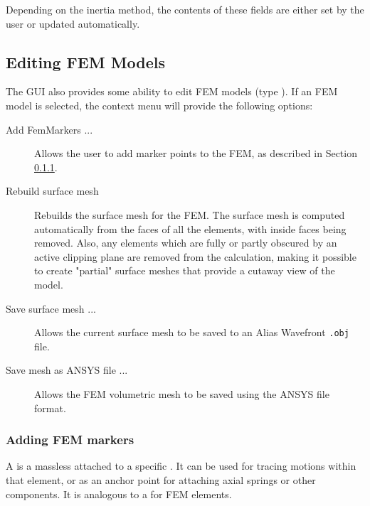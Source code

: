 \documentclass{article}
\begin{document}
Depending on the inertia method, the contents of these fields are
either set by the user or updated automatically.

\subsection{Editing FEM Models}

The GUI also provides some ability to edit FEM models
(type ).
If an FEM
model is selected, the context menu will provide the following
options:

\begin{description}

\item[Add FemMarkers ...]\mbox{}

Allows the user to add marker points to the FEM, as described in
Section \ref{addingFemMarkersSec}.

\item[Rebuild surface mesh]\mbox{}
 Rebuilds the surface mesh for the FEM. The
surface mesh is computed automatically from the faces of all the
elements, with inside faces being removed. Also, any elements which
are fully or partly obscured by an active clipping plane are removed
from the calculation, making it possible to create "partial" surface
meshes that provide a cutaway view of the model.

\item[Save surface mesh ...]\mbox{}

Allows the current surface mesh to be saved to an Alias Wavefront {\tt .obj} file.

\item[Save mesh as ANSYS file ...]\mbox{}

Allows the FEM volumetric mesh to be saved using the ANSYS file format.

\end{description}

\subsubsection{Adding FEM markers}
\label{addingFemMarkersSec}

A  is a massless 
 attached to a
specific . 
It can be used for tracing motions within that element,
or as an anchor point for attaching axial
springs or other components. It is analogous to 
a  for
FEM elements.
\end{document}
